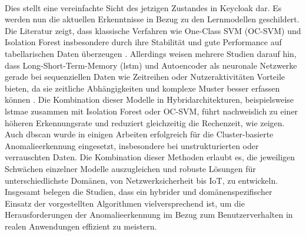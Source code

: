 \documentclass[a4paper,12pt]{article}
\begin{document}
	\\[0.5em]
	Dies stellt eine vereinfachte Sicht des jetzigen Zustandes in Keycloak dar. Es werden nun die aktuellen Erkenntnisse in Bezug zu den Lernmodellen geschildert.
	\\[0.5em]
	Die Literatur zeigt, dass klassische Verfahren wie One-Class SVM (OC-SVM) und Isolation Forest insbesondere durch ihre Stabilität und gute Performance auf tabellarischen Daten überzeugen \cite{comparative_timeseries2021, arjunan2024, zhou2021deep}. Allerdings weisen mehrere Studien darauf hin, dass Long-Short-Term-Memory (\gls{lstm}) und Autoencoder als neuronale Netzwerke gerade bei sequenziellen Daten wie Zeitreihen oder Nutzeraktivitäten Vorteile bieten, da sie zeitliche Abhängigkeiten und komplexe Muster besser erfassen können \cite{malhotra2016lstm, wei2022lstm, demir2024comparative}. Die Kombination dieser Modelle in Hybridarchitekturen, beispielsweise \gls{lstmae} zusammen mit Isolation Forest oder OC-SVM, führt nachweislich zu einer höheren Erkennungsrate und reduziert gleichzeitig die Rechenzeit, wie \cite{hybrid_if_lstm2023, ergen2017unsupervised} zeigen. Auch \gls{dbscan} wurde in einigen Arbeiten erfolgreich für die Cluster-basierte Anomalieerkennung eingesetzt, insbesondere bei unstrukturierten oder verrauschten Daten. Die Kombination dieser Methoden erlaubt es, die jeweiligen Schwächen einzelner Modelle auszugleichen und robuste Lösungen für unterschiedlichste Domänen, von Netzwerksicherheit bis IoT, zu entwickeln. Insgesamt belegen die Studien, dass ein hybrider und domänenspezifischer Einsatz der vorgestellten Algorithmen vielversprechend ist, um die Herausforderungen der Anomalieerkennung im Bezug zum Benutzerverhalten in realen Anwendungen effizient zu meistern.
	
\end{document}
